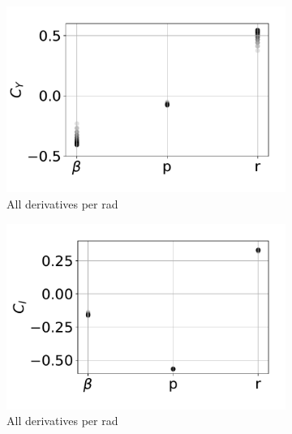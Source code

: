 \begin{figure}[hbt!]
	\centering
	\begin{subfigure}[b]{0.33\textwidth}
		\includegraphics[width=1.0\textwidth]{CyCstSpan}
		\caption{All derivatives per rad}
		\label{fig:CyCstSpan}
	\end{subfigure}
	\begin{subfigure}[b]{0.33\textwidth}
		\includegraphics[width=\textwidth]{ClCstSpan}
		\caption{All derivatives per rad}
		\label{fig:ClCstSpan}
	\end{subfigure}
	\begin{subfigure}[b]{0.33\textwidth}

\end{subfigure}
\end{figure}
